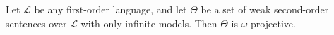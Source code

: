 Let $\mathcal{L}$ be any first-order language, and let $\Theta$ be a set of weak second-order sentences over $\mathcal{L}$ with only infinite models. Then $\Theta$ is $\omega$-projective.

